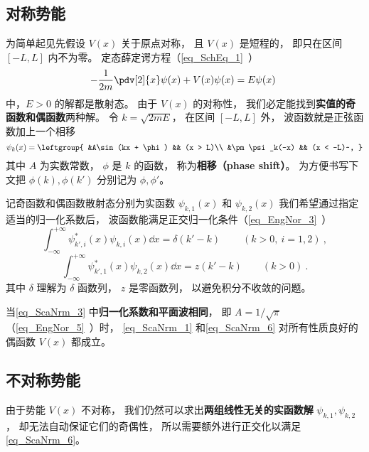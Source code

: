 \subsection{对称势能}
为简单起见先假设 $V(x)$ 关于原点对称， 且 $V(x)$ 是短程的， 即只在区间 $[-L,L]$ 内不为零。 定态薛定谔方程（\autoref{eq_SchEq_1}~）
\begin{equation}
-\frac{1}{2m}\pdv[2]{x}\psi(x) + V(x)\psi(x) = E\psi(x)~
\end{equation}
中，$E > 0$ 的解都是散射态。 由于 $V(x)$ 的对称性， 我们必定能找到\textbf{实值的奇函数和偶函数}两种解。 令 $k = \sqrt{2mE}$， 在区间 $[-L,L]$ 外， 波函数就是正弦函数加上一个相移
\begin{equation}\label{eq_ScaNrm_3}
\psi_k(x) = \leftgroup{
&A\sin(kx + \phi) && (x > L)\\
&\pm \psi_k(-x) && (x < -L)~,
}\end{equation}
其中 $A$ 为实数常数， $\phi$ 是 $k$ 的函数， 称为\textbf{相移（phase shift）}。 为方便书写下文把 $\phi(k),\phi(k')$ 分别记为 $\phi, \phi'$。

记奇函数和偶函数散射态分别为实函数 $\psi_{k,1}(x)$ 和 $\psi_{k,2}(x)$ 我们希望通过指定适当的归一化系数后， 波函数能满足正交归一化条件（\autoref{eq_EngNor_3}~）
\begin{equation}\label{eq_ScaNrm_1}
\int_{-\infty}^{+\infty} \psi_{k',i}^*(x) \psi_{k,i}(x) \dd{x} = \delta(k' - k)~\qquad (k > 0,\ i = 1, 2)~,
\end{equation}
\begin{equation}\label{eq_ScaNrm_6}
\int_{-\infty}^{+\infty} \psi_{k',1}^*(x) \psi_{k,2}(x) \dd{x} = z(k' - k) \qquad (k > 0)~.
\end{equation}
其中 $\delta$ 理解为 $\delta$ 函数列， $z$ 是零函数列， 以避免积分不收敛的问题。

\begin{theorem}{}\label{the_ScaNrm_1}
当\autoref{eq_ScaNrm_3} 中\textbf{归一化系数和平面波相同}， 即 $A = 1/\sqrt{\pi}$（\autoref{eq_EngNor_5}~）时， \autoref{eq_ScaNrm_1} 和\autoref{eq_ScaNrm_6} 对所有性质良好的偶函数 $V(x)$ 都成立。
\end{theorem}

\subsection{不对称势能}
由于势能 $V(x)$ 不对称， 我们仍然可以求出\textbf{两组线性无关的实函数解} $\psi_{k,1},\psi_{k,2}$， 却无法自动保证它们的奇偶性， 所以需要额外进行正交化以满足\autoref{eq_ScaNrm_6}。

